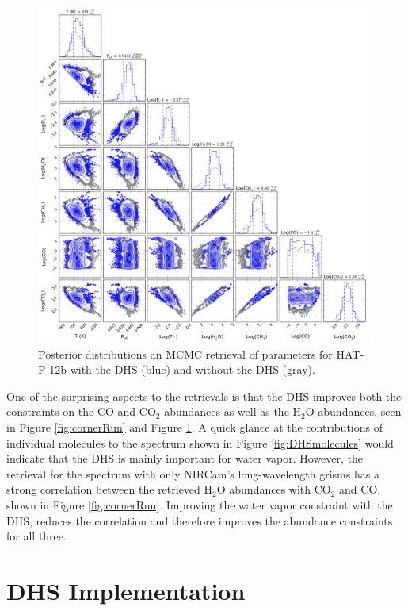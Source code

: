\documentclass[iop]{emulateapj}
\begin{document}
\begin{figure}
\centering
\includegraphics[width=1.0\textwidth]{HAT-P-12b_kmr_cloudy_corner.png}
\caption{Posterior distributions an MCMC retrieval of parameters for HAT-P-12b with the DHS (blue) and without the DHS (gray).}\label{fig:cornerHATp12}
\end{figure}

One of the surprising aspects to the retrievals is that the DHS improves both the constraints on the CO and CO$_2$ abundances as well as the H$_2$O abundances, seen in Figure \ref{fig:cornerRun} and Figure \ref{fig:cornerHATp12}. 
A quick glance at the contributions of individual molecules to the spectrum shown in Figure \ref{fig:DHSmolecules} would indicate that the DHS is mainly important for water vapor.
However, the retrieval for the spectrum with only NIRCam's long-wavelength grisms has a strong correlation between the retrieved H$_2$O abundances with CO$_2$ and CO, shown in Figure \ref{fig:cornerRun}.
Improving the water vapor constraint with the DHS, reduces the correlation and therefore improves the abundance constraints for all three.

\section{DHS Implementation}\label{sec:implementation}
\end{document}
